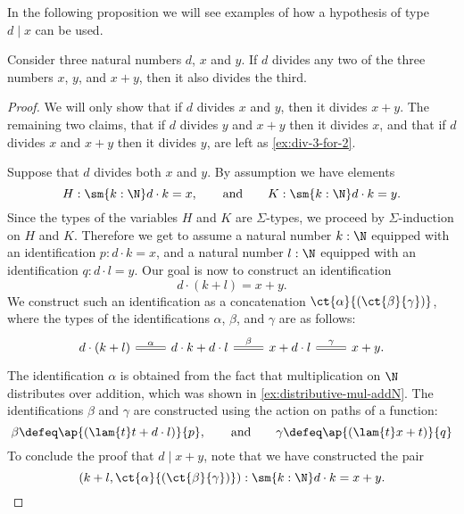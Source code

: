 In the following proposition we will see examples of how a hypothesis of type $d\mid x$ can be used.

\begin{prp}\label{prp:div-3-for-2}
  Consider three natural numbers $d$, $x$ and $y$. If $d$ divides any two of the three numbers $x$, $y$, and $x+y$, then it also divides the third.
\end{prp}

\begin{proof}
  We will only show that if $d$ divides $x$ and $y$, then it divides $x+y$. The remaining two claims, that if $d$ divides $y$ and $x+y$ then it divides $x$, and that if $d$ divides $x$ and $x+y$ then it divides $y$, are left as \cref{ex:div-3-for-2}.

  Suppose that $d$ divides both $x$ and $y$. By assumption we have elements
  \begin{equation*}
    H:\sm{k:\N}d\cdot k=x,\qquad\text{and}\qquad K:\sm{k:\N}d\cdot k=y.
  \end{equation*}
  Since the types of the variables $H$ and $K$ are $\Sigma$-types, we proceed by $\Sigma$-induction on $H$ and $K$. Therefore we get to assume a natural number $k:\N$ equipped with an identification $p:d\cdot k=x$, and a natural number $l:\N$ equipped with an identification $q:d\cdot l=y$. Our goal is now to construct an identification
  \begin{equation*}
    d\cdot (k+l)=x+y.
  \end{equation*}
We construct such an identification as a concatenation $\ct{\alpha}{(\ct{\beta}{\gamma})}$, where the types of the identifications $\alpha$, $\beta$, and $\gamma$ are as follows:
  \begin{equation*}
    \begin{tikzcd}
      d\cdot(k+l) \arrow[r,equals,"\alpha"] & d\cdot k+d\cdot l \arrow[r,equals,"\beta"] & x+d\cdot l \arrow[r,equals,"\gamma"] & x+y.
    \end{tikzcd}
  \end{equation*}
  The identification $\alpha$ is obtained from the fact that multiplication on $\N$ distributes over addition, which was shown in \cref{ex:distributive-mul-addN}. The identifications $\beta$ and $\gamma$ are constructed using the action on paths of a function:
  \begin{equation*}
    \beta\defeq\ap{(\lam{t}t+d\cdot l)}{p},\qquad\text{and}\qquad \gamma\defeq \ap{(\lam{t}x+t)}{q}
  \end{equation*}
  To conclude the proof that $d\mid x+y$, note that we have constructed the pair
  \begin{equation*}
    (k+l,\ct{\alpha}{(\ct{\beta}{\gamma})}):\sm{k:\N}d\cdot k=x+y.\qedhere
  \end{equation*}
\end{proof}

